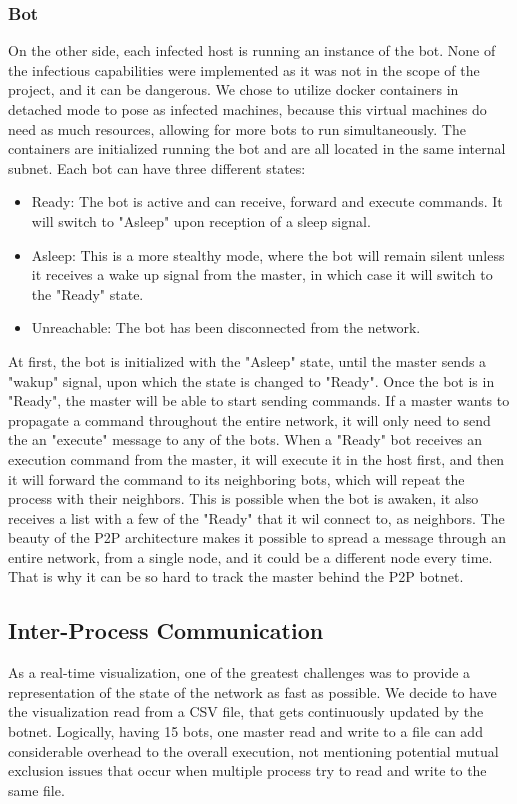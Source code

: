 \documentclass{proc}
\begin{document}
\subsubsection{Bot}
On the other side, each infected host is running an instance of the bot. None of the infectious capabilities were implemented as it was not in the scope of the project, and it can be dangerous. We chose to utilize docker containers in detached mode to pose as infected machines, because this virtual machines do need as much resources, allowing for more bots to run simultaneously. The containers are initialized running the bot and are all located in the same internal subnet. Each bot can have three different states: 
\begin{itemize}
    \item Ready: The bot is active and can receive, forward and execute commands. It will switch to "Asleep" upon reception of a sleep signal.
    \item Asleep: This is a more stealthy mode, where the bot will remain silent unless it receives a wake up signal from the master, in which case it will switch to the "Ready" state. 
    \item Unreachable: The bot has been disconnected from the network.
\end{itemize}
At first, the bot is initialized with the "Asleep" state, until the master sends a "wakup" signal, upon which the state is changed to "Ready". Once the bot is in "Ready", the master will be able to start sending commands. If a master wants to propagate a command throughout the entire network, it will only need to send the an "execute" message to any of the bots. When a "Ready" bot receives an execution command from the master, it will execute it in the host first, and then it will forward the command to its neighboring bots, which will repeat the process with their neighbors. This is possible when the bot is awaken, it also receives a list with a few of the "Ready" that it wil connect to, as neighbors. The beauty of the P2P architecture makes it possible to spread a message through an entire network, from a single node, and it could be a different node every time. That is why it can be so hard to track the master behind the P2P botnet.  


\subsection{Inter-Process Communication}
As a real-time visualization, one of the greatest challenges was to provide a representation of the state of the network as fast as possible. We decide to have the visualization read from a CSV file, that gets continuously updated by the botnet. Logically, having 15 bots, one master read and write to a file can add considerable overhead to the overall execution, not mentioning potential mutual exclusion issues that occur when multiple process try to read and write to the same file. 
\end{document}
